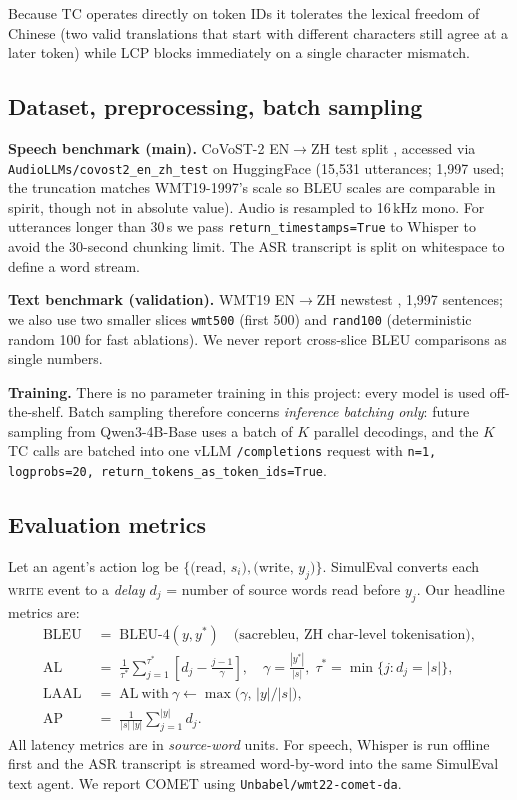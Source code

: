 \documentclass{article}
\begin{document}
Because TC operates directly on token IDs it tolerates the lexical freedom of Chinese (two valid
translations that start with different characters still agree at a later token) while LCP blocks
immediately on a single character mismatch.

\subsection{Dataset, preprocessing, batch sampling}
\label{sec:data}

\textbf{Speech benchmark (main).} CoVoST-2 EN$\rightarrow$ZH test split
\citep{wang2020covost2}, accessed via \texttt{AudioLLMs/covost2\_en\_zh\_test} on HuggingFace
(15{,}531 utterances; 1{,}997 used; the truncation matches WMT19-1997's scale so BLEU scales are
comparable in spirit, though not in absolute value). Audio is resampled to 16\,kHz mono. For
utterances longer than 30\,s we pass \texttt{return\_timestamps=True} to Whisper to avoid the
30-second chunking limit. The ASR transcript is split on whitespace to define a word stream.

\textbf{Text benchmark (validation).} WMT19 EN$\rightarrow$ZH newstest \citep{wmt19}, 1{,}997
sentences; we also use two smaller slices \texttt{wmt500} (first 500) and \texttt{rand100}
(deterministic random 100 for fast ablations). We never report cross-slice BLEU comparisons as
single numbers.

\textbf{Training.} There is no parameter training in this project: every model is used
off-the-shelf. Batch sampling therefore concerns \emph{inference batching only}:
future sampling from Qwen3-4B-Base uses a batch of $K$ parallel decodings, and the $K$ TC calls
are batched into one vLLM \texttt{/completions} request with \texttt{n=1, logprobs=20,
return\_tokens\_as\_token\_ids=True}.

\subsection{Evaluation metrics}
\label{sec:metrics}

Let an agent's action log be $\{\text{(read, $s_i$)}, \text{(write, $y_j$)}\}$. SimulEval
converts each \textsc{write} event to a \emph{delay} $d_j$ = number of source words read before
$y_j$. Our headline metrics are:
\begin{align}
\mathrm{BLEU} \;&=\; \mathrm{BLEU\text{-}4}(y, y^{*}) \quad \text{(sacrebleu, ZH char-level tokenisation)},\\
\mathrm{AL} \;&=\; \frac{1}{\tau^{*}}\sum_{j=1}^{\tau^{*}} \left[d_j - \frac{j-1}{\gamma}\right],
\quad \gamma=\frac{|y^{*}|}{|s|},\; \tau^{*}=\min\{j:d_j=|s|\},\\
\mathrm{LAAL} \;&=\; \mathrm{AL\ with\ } \gamma \leftarrow \max\bigl(\gamma,\,|y|/|s|\bigr),\\
\mathrm{AP} \;&=\; \frac{1}{|s|\,|y|}\sum_{j=1}^{|y|} d_j.
\end{align}
All latency metrics are in \emph{source-word} units. For speech, Whisper is run offline first and
the ASR transcript is streamed word-by-word into the same SimulEval text agent. We report COMET
\citep{rei2020comet} using \texttt{Unbabel/wmt22-comet-da}.
\end{document}
